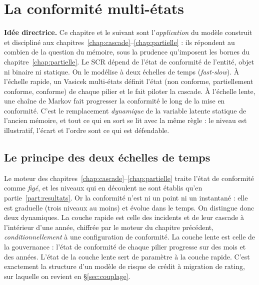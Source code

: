 \chapter{La conformité multi-états}
\label{chap:multietats}

\begin{cle}
\textbf{Idée directrice.} Ce chapitre et le suivant sont l'\emph{application} du modèle
construit et discipliné aux chapitres~\ref{chap:cascade}--\ref{chap:partielle} : ils
répondent au \og combien \fg{} de la question du mémoire, sous la prudence qu'imposent les
bornes du chapitre~\ref{chap:partielle}. Le SCR dépend de l'état de conformité de
l'entité, objet ni binaire ni statique. On le modélise à deux échelles de temps
(\emph{fast-slow}). À l'échelle rapide, un Vasicek multi-états définit l'état (non
conforme, partiellement conforme, conforme) de chaque pilier et le fait piloter la cascade. À
l'échelle lente, une chaîne de Markov fait progresser la conformité le long de la
mise en conformité. C'est le remplacement \emph{dynamique} de la variable latente statique de
l'ancien mémoire, et tout ce qui en sort se lit avec la même règle : le niveau est
illustratif, l'écart et l'ordre sont ce qui est défendable.
\end{cle}

\section{Le principe des deux échelles de temps}

Le moteur des chapitres~\ref{chap:cascade}--\ref{chap:partielle} traite l'état de conformité
comme \emph{figé}, et les niveaux qui en découlent ne sont établis qu'en
partie~\ref{part:resultats}. Or la
conformité n'est ni un point ni un instantané : elle est graduelle (trois niveaux au moins) et
évolue dans le temps. On distingue donc deux dynamiques. La couche rapide est celle des
incidents et de leur cascade à l'intérieur d'une année, chiffrée par le moteur du
chapitre précédent, \emph{conditionnellement} à une configuration de conformité. La couche
lente est celle de la gouvernance : l'état de conformité de chaque pilier progresse sur des
mois et des années. L'état de la couche lente sert de paramètre à la couche rapide.
C'est exactement la structure d'un modèle de risque de crédit à migration de rating, sur
laquelle on revient en \S\ref{sec:couplage}.

